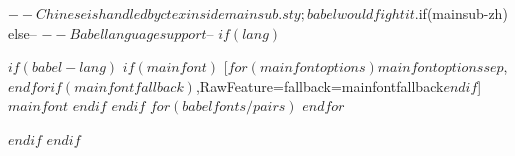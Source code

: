 $-- Chinese is handled by ctex inside mainsub.sty; babel would fight it.
$if(mainsub-zh)$
$else$
$--
$-- Babel language support
$--
$if(lang)$
\ifLuaTeX
\usepackage[bidi=basic$if(shorthands)$$else$,shorthands=off$endif$$for(babeloptions)$,$babeloptions$$endfor$]{babel}
\else
\usepackage[bidi=default$if(shorthands)$$else$,shorthands=off$endif$$for(babeloptions)$,$babeloptions$$endfor$]{babel}
\fi
$if(babel-lang)$
$if(mainfont)$
\ifPDFTeX
\else
{}[$for(mainfontoptions)$$mainfontoptions$$sep$,$endfor$$if(mainfontfallback)$,RawFeature={fallback=mainfontfallback}$endif$]{$mainfont$}
\fi
$endif$
$endif$
$for(babelfonts/pairs)$
$endfor$
\ifLuaTeX
  \usepackage{selnolig} %
\fi
$endif$
$endif$
